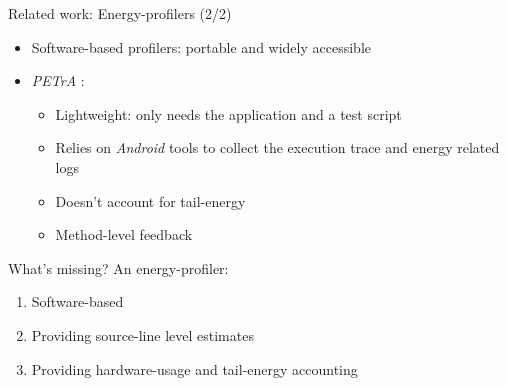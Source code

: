 %
\begin{frame}{Related work: Energy-profilers (2/2)}
\begin{itemize}
\item \alert{Software-based} profilers: portable and widely accessible
\item \textit{PETrA} \cite{petra}:
\begin{itemize}
\item Lightweight: only needs the application and a test script
\item \alert{Relies on \textit{Android}} tools to collect the execution trace and energy related logs
\item Doesn't account for tail-energy
\item \alert{Method-level} feedback
\end{itemize}
\end{itemize}
\end{frame}
%
%
\begin{frame}{What's missing?}
An energy-profiler:
\begin{enumerate}
\item \alert{Software-based}
\item Providing \alert{source-line level} estimates
\item Providing hardware-usage and \alert{tail-energy} accounting
\end{enumerate}
\end{frame}
%
%
